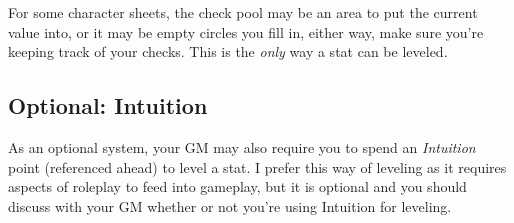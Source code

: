 \documentclass[../main.tex]{subfiles}
\begin{document}
    For some character sheets, the check pool may be an area to put the current value into, or it may be empty circles you fill in, either way, make sure you're keeping track of your checks. This is the \emph{only} way a stat can be leveled.

    \subsection{Optional: Intuition}
    
    As an optional system, your GM may also require you to spend an \emph{Intuition} point (referenced ahead) to level a stat. I prefer this way of leveling as it requires aspects of roleplay to feed into gameplay, but it is optional and you should discuss with your GM whether or not you're using Intuition for leveling.
\end{document}
